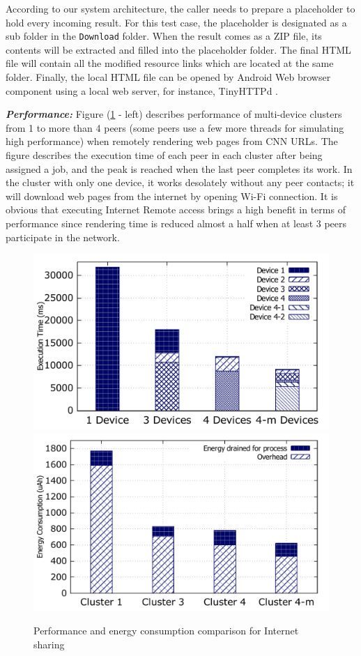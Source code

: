 \documentclass{sig-alternate}[10pt]
\begin{document}
\begin{CCSXML}
According to our system architecture, the caller needs to prepare a placeholder to hold every incoming result. For this test case, the placeholder is designated as a sub folder in the \texttt{Download} folder. When the result comes as a ZIP file, its contents will be extracted and filled into the placeholder folder. The final HTML file will contain all the modified resource links which are located at the same folder. Finally, the local HTML file can be opened by Android Web browser component using a local web server, for instance, TinyHTTPd \cite{tinyhttpd}.

\textbf{\emph{Performance:}}
Figure (\ref{fig:net_clusters_perf} - left) describes performance of multi-device clusters from 1 to more than 4 peers (some peers use a few more threads for simulating high performance) when remotely rendering web pages from CNN URLs. The figure describes the execution time of each peer in each cluster after being assigned a job, and the peak is reached when the last peer completes its work. In the cluster with only one device, it works desolately without any peer contacts; it will download web pages from the internet by opening Wi-Fi connection. It is obvious that executing Internet Remote access brings a high benefit in terms of performance since rendering time is reduced almost a half when at least 3 peers participate in the network. 

\begin{figure}
	\centering
		\includegraphics[width=.45\textwidth]{data/net_perf_01.pdf}
		\includegraphics[width=.45\textwidth]{data/net_energy.pdf}
	\caption{Performance and energy consumption comparison for Internet sharing}
	\label{fig:net_clusters_perf}
\end{figure}


\end{CCSXML}
\end{document}
